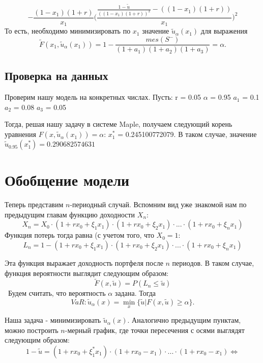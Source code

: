 \documentclass[14pt,a4paper]{article}
\theoremstyle{plain}
\theoremstyle{definition}
\begin{document}
$$
-\frac{(1-x_1)(1+r)}{x_1}\Bigg(\frac{\frac{1-\tilde{u}}{((1-x_1)(1+r))^{2}} - ((1-x_1)(1+r))}{x_1}\Bigg)^{2}
$$
То есть, необходимо минимизировать по $x_1$ значение $\tilde{u}_\alpha(x_1)$ для выражения $$\tilde{F}(x_1,\tilde{u}_\alpha(x_1))=1-\frac{mes(S^-)}{(1+a_1)(1+a_2)(1+a_3)} = \alpha.$$

 \subsection{Проверка на данных}
\vspace{2pc}


Проверим нашу модель на конкретных числах.
Пусть:
r = 0.05
$\alpha$ = 0.95
$a_1$ = 0.1
$a_2$ = 0.08
$a_3$ = 0.05

Тогда, решая нашу задачу в системе Maple, получаем следующий корень уравнения $F (x,\tilde{u}_\alpha(x_1)) = \alpha$:
$x_1^*$ = 0.245100772079.
В таком случае, значение $\tilde{u}_{0.95}(x_1^*) = 0.290682574631$



 \section{Обобщение модели}


Теперь представим $n$-периодный случай.
Вспомним вид уже знакомой нам по предыдущим главам функцию доходности $X_n$:
$$
X_n = X_0 \cdot (1+rx_0+\xi_1 x_1) \cdot (1+rx_0+\xi_2 x_1) \cdot ... \cdot (1+rx_0+\xi_n x_1)
$$
Функция потерь тогда равна (с учетом того, что $X_0 = 1$:
$$
L_n = 1 - (1+rx_0+\xi_1 x_1) \cdot (1+rx_0+\xi_2 x_1) \cdot ... \cdot (1+rx_0+\xi_n x_1)
$$

Эта функция выражает доходность портфеля после $n$ периодов.
В таком случае, функция вероятности выглядит следующим образом:
$$
\tilde{F}(x,\tilde{u}) = P(L_n \le \tilde{u})
$$\
Будем считать, что вероятность $\alpha$ задана.
Тогда
$$
VaR: \tilde{u}_\alpha (x) = \min\limits_{x} \{\tilde{u}|F(x,\tilde{u})\ge \alpha\}.
$$

Наша задача - минимизировать $\tilde{u}_\alpha (x)$.
Аналогично предыдущим пунктам, можно построить $n$-мерный график, где точки пересечения с осями выглядят следующим образом:
$$
1-\tilde{u} = (1+rx_0 + \xi^*_1 x_1) \cdot (1+rx_0- x_1) \cdot ... \cdot (1+rx_0- x_1) \Longleftrightarrow
$$
\end{document}
